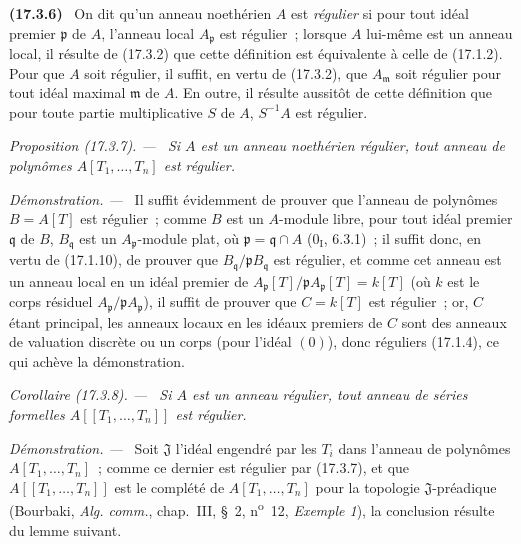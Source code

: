 \documentclass[10pt,oneside]{book}
\makeatletter
\newcommand{\setmanualcurrentlabel}[1]{\def\@currentlabel{#1}}
\newenvironment{env}[1][]{\setmanualcurrentlabel{#1}\par\medskip\noindent\textbf{(#1)}\ }{\par}
\newenvironment{proposition}[1][]{%
  \setmanualcurrentlabel{#1}\par\medskip\noindent\itshape Proposition (#1). ---\ }{\par}
\newenvironment{corollary}[1][]{%
  \setmanualcurrentlabel{#1}\par\medskip\noindent\itshape Corollaire (#1). ---\ }{\par}
\newenvironment{proof}{%
  \par\medskip\noindent\textit{Démonstration. ---\ }}{\par}
\makeatother
\begin{document}
\begin{env}[17.3.6]
\label{0.17.3.6-fr}
On dit qu'un anneau noethérien $A$ est \emph{régulier} si pour tout idéal
premier $\mathfrak{p}$ de $A$, l'anneau local $A_{\mathfrak{p}}$ est
régulier~; lorsque $A$ lui-même est un anneau local, il résulte de (17.3.2)
que cette définition est équivalente à celle de (17.1.2). Pour que $A$ soit
régulier, il suffit, en vertu de (17.3.2), que $A_{\mathfrak{m}}$ soit
régulier pour tout idéal maximal $\mathfrak{m}$ de $A$. En outre, il résulte
aussitôt de cette définition que pour toute partie multiplicative $S$ de
$A$, $S^{-1}A$ est régulier.
\end{env}

\begin{proposition}[17.3.7]
\label{0.17.3.7-fr}
Si $A$ est un anneau noethérien régulier, tout anneau de polynômes
$A[T_1,\ldots,T_n]$ est régulier.
\end{proposition}

\begin{proof}
Il suffit évidemment de prouver que l'anneau de polynômes $B=A[T]$ est
régulier~; comme $B$ est un $A$-module libre, pour tout idéal premier
$\mathfrak{q}$ de $B$, $B_{\mathfrak{q}}$ est un
$A_{\mathfrak{p}}$-module plat, où $\mathfrak{p}=\mathfrak{q}\cap A$
($0_{\mathrm I}$, 6.3.1)~; il suffit donc, en vertu de (17.1.10), de prouver
que $B_{\mathfrak{q}}/\mathfrak{p}B_{\mathfrak{q}}$ est régulier, et comme
cet anneau est un anneau local en un idéal premier de
$A_{\mathfrak{p}}[T]/\mathfrak{p}A_{\mathfrak{p}}[T]=k[T]$ (où $k$ est le
corps résiduel $A_{\mathfrak{p}}/\mathfrak{p}A_{\mathfrak{p}}$), il suffit
de prouver que $C=k[T]$ est régulier~; or, $C$ étant principal, les anneaux
locaux en les idéaux premiers de $C$ sont des anneaux de valuation discrète
ou un corps (pour l'idéal $(0)$), donc réguliers (17.1.4), ce qui achève la
démonstration.
\end{proof}

\begin{corollary}[17.3.8]
\label{0.17.3.8-fr}
Si $A$ est un anneau régulier, tout anneau de séries formelles
$A[[T_1,\ldots,T_n]]$ est régulier.
\end{corollary}

\begin{proof}
Soit $\mathfrak{J}$ l'idéal engendré par les $T_i$ dans l'anneau de polynômes
$A[T_1,\ldots,T_n]$~; comme ce dernier est régulier par (17.3.7), et que
$A[[T_1,\ldots,T_n]]$ est le complété de $A[T_1,\ldots,T_n]$ pour la
topologie $\mathfrak{J}$-préadique (Bourbaki, \emph{Alg. comm.}, chap.~III,
\S~2, n\textsuperscript{o}~12, \emph{Exemple 1}), la conclusion résulte du lemme suivant.
\end{proof}
\end{document}
